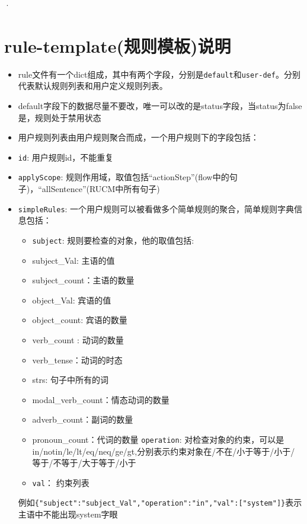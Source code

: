 ·\chapter{rule-template(规则模板)说明}
\begin{itemize}
    \item
    rule文件有一个dict组成，其中有两个字段，分别是\texttt{default}和\texttt{user-def}。分别代表默认规则列表和用户定义规则列表。
    \item
    default字段下的数据尽量不要改，唯一可以改的是status字段，当status为false是，规则处于禁用状态
    \item
    用户规则列表由用户规则聚合而成，一个用户规则下的字段包括：
    \item
    \texttt{id}: 用户规则id，不能重复
    \item
    \texttt{applyScope}:
    规则作用域，取值包括``actionStep''(flow中的句子)，``allSentence''(RUCM中所有句子)
    
    \item
    \texttt{simpleRules}:
    一个用户规则可以被看做多个简单规则的聚合，简单规则字典信息包括：
        \begin{itemize}
        \item
            \texttt{subject}: 规则要检查的对象，他的取值包括:
        \item
            subject\_Val: 主语的值
        \item
            subject\_count：主语的数量
        \item
            object\_Val: 宾语的值
        \item
            object\_count: 宾语的数量
        \item
            verb\_count : 动词的数量
        \item
            verb\_tense：动词的时态
        \item
            strs: 句子中所有的词
        \item
            modal\_verb\_count：情态动词的数量
        \item
            adverb\_count：副词的数量
        \item
            pronoun\_count：代词的数量
            \texttt{operation}:
            对检查对象的约束，可以是in/notin/le/lt/eq/neq/ge/gt,分别表示约束对象在/不在/小于等于/小于/等于/不等于/大于等于/小于
        \item
            \texttt{val}： 约束列表
        \end{itemize}
            例如\texttt{\{"subject":"subject\_Val","operation":"in","val":{[}"system"{]}\}}表示主语中不能出现system字眼
            

\end{itemize}

